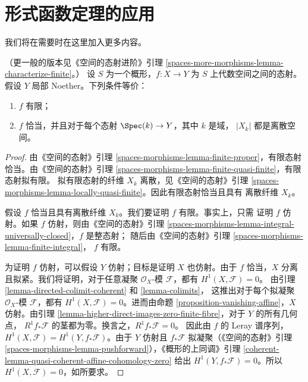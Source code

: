 \section{形式函数定理的应用}
\label{section-applications-formal-functions}

\noindent
我们将在需要时在这里加入更多内容。

\begin{lemma}
\label{lemma-characterize-finite}
（更一般的版本见《空间的态射进阶》引理
\ref{spaces-more-morphisms-lemma-characterize-finite}。）
设 $S$ 为一个概形，$f : X \to Y$ 为 $S$ 上代数空间之间的态射。
假设 $Y$ 局部 Noether。下列条件等价：
\begin{enumerate}
\item $f$ 有限；
\item $f$ 恰当，并且对于每个态射 $\Spec(k) \to Y$，其中 $k$ 是域，
$|X_k|$ 都是离散空间。
\end{enumerate}
\end{lemma}

\begin{proof}
由《空间的态射》引理 \ref{spaces-morphisms-lemma-finite-proper}，有限态射
恰当。由《空间的态射》引理
\ref{spaces-morphisms-lemma-finite-quasi-finite}，有限态射拟有限。
拟有限态射的纤维 $X_k$ 离散，见《空间的态射》引理
\ref{spaces-morphisms-lemma-locally-quasi-finite}。因此有限态射恰当且具有
离散纤维 $X_k$。

\medskip\noindent
假设 $f$ 恰当且具有离散纤维 $X_k$。我们要证明 $f$ 有限。事实上，只需
证明 $f$ 仿射。如果 $f$ 仿射，则由《空间的态射》引理
\ref{spaces-morphisms-lemma-integral-universally-closed}，$f$ 是整态射；
随后由《空间的态射》引理 \ref{spaces-morphisms-lemma-finite-integral}，
$f$ 有限。

\medskip\noindent
为证明 $f$ 仿射，可以假设 $Y$ 仿射；目标是证明 $X$ 也仿射。由于 $f$
恰当，$X$ 分离且拟紧。我们将证明，对于任意凝聚
$\mathcal{O}_X$-模 $\mathcal{F}$，都有 $H^1(X, \mathcal{F}) = 0$。
由引理 \ref{lemma-directed-colimit-coherent} 和 \ref{lemma-colimits}，
这推出对于每个拟凝聚 $\mathcal{O}_X$-模 $\mathcal{F}$，都有
$H^1(X, \mathcal{F}) = 0$。进而由命题
\ref{proposition-vanishing-affine}，$X$ 仿射。由引理
\ref{lemma-higher-direct-images-zero-finite-fibre}，对于 $Y$ 的所有几何点，
$R^1f_*\mathcal{F}$ 的茎都为零。换言之，$R^1f_*\mathcal{F} = 0$。
因此由 $f$ 的 Leray 谱序列，
$H^1(X , \mathcal{F}) = H^1(Y, f_*\mathcal{F})$。由于 $Y$ 仿射且
$f_*\mathcal{F}$ 拟凝聚（《空间的态射》引理
\ref{spaces-morphisms-lemma-pushforward}），《概形的上同调》引理
\ref{coherent-lemma-quasi-coherent-affine-cohomology-zero} 给出
$H^1(Y, f_*\mathcal{F}) = 0$。所以 $H^1(X, \mathcal{F}) = 0$，如所要求。
\end{proof}

